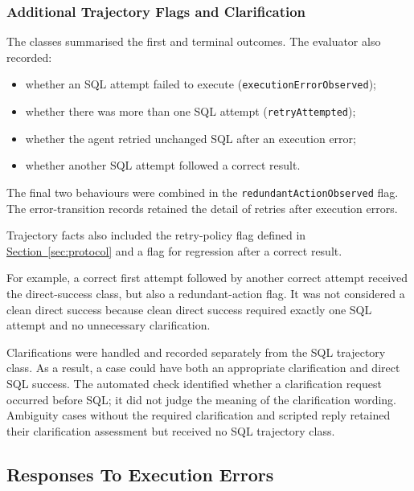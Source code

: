 \subsubsection{Additional Trajectory Flags and Clarification}

The classes summarised the first and terminal outcomes. The evaluator also
recorded:

\begin{itemize}
    \item whether an SQL attempt failed to execute (\texttt{executionErrorObserved});

    \item whether there was more than one SQL attempt (\texttt{retryAttempted});

    \item whether the agent retried unchanged SQL after an execution error;

    \item whether another SQL attempt followed a correct result.
\end{itemize}

The final two behaviours were combined in the \texttt{redundantActionObserved}
flag. The error-transition records retained the detail of retries after
execution errors.

Trajectory facts also included the retry-policy flag defined in
\hyperref[sec:protocol]{Section~\ref*{sec:protocol}} and a flag for regression after a correct result.

For example, a correct first attempt followed by another correct attempt
received the direct-success class, but also a redundant-action flag.
It was not considered a clean direct success 
because clean direct success required exactly one SQL attempt and no unnecessary clarification.

Clarifications were handled and recorded separately from the SQL trajectory class. 
As a result, a case could have both an appropriate clarification and direct SQL success.
The automated check identified whether a clarification request occurred before
SQL; it did not judge the meaning of the clarification wording. 
Ambiguity cases without the required clarification and scripted reply retained their
clarification assessment but received no SQL trajectory class.


\subsection{Responses To Execution Errors}
\label{sec:error-responses}

